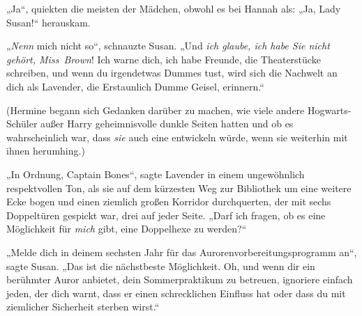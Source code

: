 „Ja“, quiekten die meisten der Mädchen, obwohl es bei Hannah als:
„Ja, Lady Susan!“ herauskam.

„\emph{Nenn} mich nicht so“, schnauzte Susan.
„Und \emph{ich glaube, ich habe Sie nicht gehört, Miss~Brown}! Ich warne dich, ich habe Freunde, die Theaterstücke schreiben, und wenn du irgendetwas Dummes tust, wird sich die Nachwelt an dich als Lavender, die Erstaunlich Dumme Geisel, erinnern.“

(Hermine begann sich Gedanken darüber zu machen, wie viele andere Hogwarts-Schüler außer Harry geheimnisvolle dunkle Seiten hatten und ob es wahrscheinlich war, dass \emph{sie} auch eine entwickeln würde, wenn sie weiterhin mit ihnen herumhing.)

„In Ordnung, Captain Bones“, sagte Lavender in einem ungewöhnlich respektvollen Ton, als sie auf dem kürzesten Weg zur Bibliothek um eine weitere Ecke bogen und einen ziemlich großen Korridor durchquerten, der mit sechs Doppeltüren gespickt war, drei auf jeder Seite.
„Darf ich fragen, ob es eine Möglichkeit für \emph{mich} gibt, eine Doppelhexe zu werden?“

„Melde dich in deinem sechsten Jahr für das Aurorenvorbereitungsprogramm an“, sagte Susan.
„Das ist die nächstbeste Möglichkeit. Oh, und wenn dir ein berühmter Auror anbietet, dein Sommerpraktikum zu betreuen, ignoriere einfach jeden, der dich warnt, dass er einen schrecklichen Einfluss hat oder dass du mit ziemlicher Sicherheit sterben wirst.“

